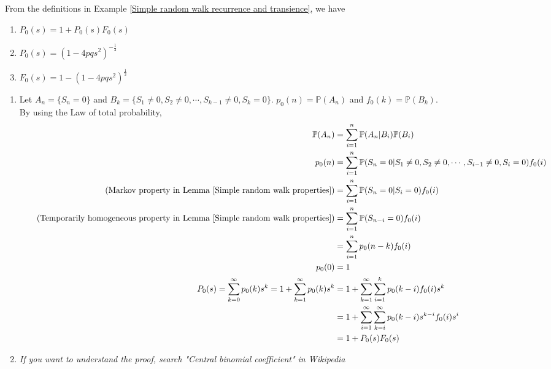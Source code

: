 \documentclass{huhtakm-template-book}
\newcommand{\prob}{\mathbb{P}}
\begin{document}
    \begin{thm}
        \label{Chapter 5 Theorem Simple random walk particle return generating function}
        From the definitions in Example \ref{Simple random walk recurrence and transience}, we have
        \begin{enumerate}
            \item $P_{0}(s)=1+P_{0}(s)F_{0}(s)$
            \item $P_{0}(s)=(1-4pqs^{2})^{-\frac{1}{2}}$
            \item $F_{0}(s)=1-(1-4pqs^{2})^{\frac{1}{2}}$
        \end{enumerate}
    \end{thm}
    \newpage
    \begin{proofing}
        \begin{enumerate}
            \item Let $A_{n}=\{S_{n}=0\}$ and $B_{k}=\{S_{1}\neq 0,S_{2}\neq 0,\cdots,S_{k-1}\neq 0,S_{k}=0\}$. $p_{0}(n)=\prob(A_{n})$ and $f_{0}(k)=\prob(B_{k})$.\\
            By using the Law of total probability, 
            \begin{align*}
                \prob(A_{n})&=\sum_{i=1}^{n}\prob(A_{n}|B_{i})\prob(B_{i})\\
                p_{0}(n)&=\sum_{i=1}^{n}\prob(S_{n}=0|S_{1}\neq 0,S_{2}\neq 0,\cdots,S_{i-1}\neq 0,S_{i}=0)f_{0}(i)\\
                \tag{Markov property in Lemma \ref{Simple random walk properties}}
                &=\sum_{i=1}^{n}\prob(S_{n}=0|S_{i}=0)f_{0}(i)\\
                \tag{Temporarily homogeneous property in Lemma \ref{Simple random walk properties}}
                &=\sum_{i=1}^{n}\prob(S_{n-i}=0)f_{0}(i)\\
                &=\sum_{i=1}^{n}p_{0}(n-k)f_{0}(i)\\
                p_{0}(0)&=1\\
                P_{0}(s)=\sum_{k=0}^{\infty}p_{0}(k)s^{k}=1+\sum_{k=1}^{\infty}p_{0}(k)s^{k}&=1+\sum_{k=1}^{\infty}\sum_{i=1}^{k}p_{0}(k-i)f_{0}(i)s^{k}\\
                &=1+\sum_{i=1}^{\infty}\sum_{k=i}^{\infty}p_{0}(k-i)s^{k-i}f_{0}(i)s^{i}\\
                &=1+P_{0}(s)F_{0}(s)
            \end{align*}
            \item \textit{If you want to understand the proof, search "Central binomial coefficient" in Wikipedia}\\

\end{enumerate}
\end{proofing}
\end{document}
